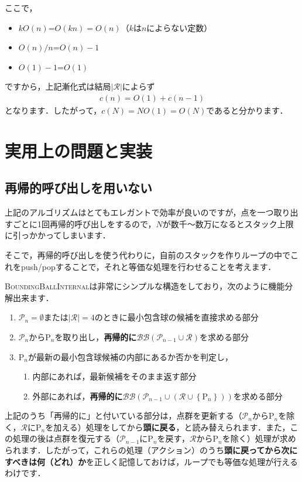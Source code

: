 ﻿\documentclass[a4paper]{jsarticle}
\begin{document}
ここで，
\begin{itemize}
\item $kO(n)$=$O(kn)=O(n)$（$k$は$n$によらない定数）
\item $O(n)/n$=$O(n)-1$
\item $O(1)-1$=$O(1)$
\end{itemize}
ですから，上記漸化式は結局$\left|\mathcal{R}\right|$によらず
\begin{align*}
c(n)=O(1)+c(n-1)
\end{align*}
となります．したがって，$c(N)=NO(1)=O(N)$であると分かります．

\section{実用上の問題と実装}

\subsection{再帰的呼び出しを用いない}

上記のアルゴリズムはとてもエレガントで効率が良いのですが，点を一つ取り出すごとに1回再帰的呼び出しをするので，$N$が数千〜数万になるとスタック上限に引っかかってしまいます．

そこで，再帰的呼び出しを使う代わりに，自前のスタックを作りループの中でこれをpush/popすることで，それと等価な処理を行わせることを考えます．

\textsc{BoundingBallInternal}は非常にシンプルな構造をしており，次のように機能分解出来ます．
\begin{enumerate}
\item $\mathcal{P}_{n}=\emptyset$または$|\mathcal{R}|=4$のときに最小包含球の候補を直接求める部分
\item $\mathcal{P}_{n}$から$\mathrm{P}_{n}$を取り出し，{\bf 再帰的に}$\mathcal{BB}(\mathcal{P}_{n-1}\cup\mathcal{R})$を求める部分
\item $\mathrm{P}_{n}$が最新の最小包含球候補の内部にあるか否かを判定し，
  \begin{enumerate}
  \item 内部にあれば，最新候補をそのまま返す部分
  \item 外部にあれば，{\bf 再帰的に}$\mathcal{BB}(\mathcal{P}_{n-1}\cup(\mathcal{R}\cup\left\{\mathrm{P}_{n}\right\}))$を求める部分
  \end{enumerate}
\end{enumerate}
上記のうち「再帰的に」と付いている部分は，点群を更新する（$\mathcal{P}_{n}$から$\mathrm{P}_{n}$を除く，$\mathcal{R}$に$\mathrm{P}_{n}$を加える）処理をしてから{\bf 頭に戻る}，と読み替えられます．また，この処理の後は点群を復元する（$\mathcal{P}_{n-1}$に$\mathrm{P}_{n}$を戻す，$\mathcal{R}$から$\mathrm{P}_{n}$を除く）処理が求められます．したがって，これらの処理（アクション）のうち{\bf 頭に戻ってから次にすべきは何（どれ）か}を正しく記憶しておけば，ループでも等価な処理が行えるわけです．
\end{document}
